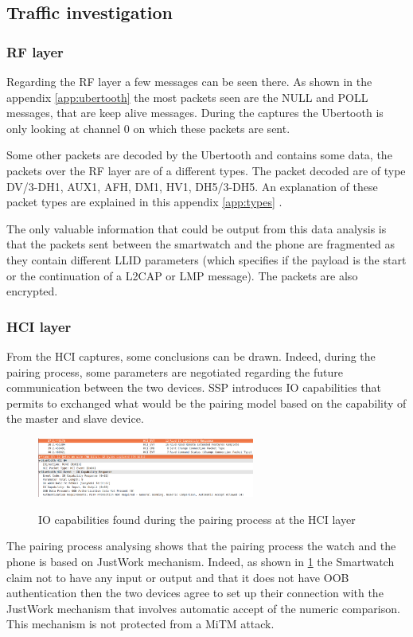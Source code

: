 \subsection{Traffic investigation}
\subsubsection{RF layer}
Regarding the RF layer a few messages can be seen there. As shown in the appendix \ref{app:ubertooth} the most packets seen are the NULL and POLL messages, that are keep alive messages. During the captures the Ubertooth is only looking at channel 0 on which these packets are sent.

Some other packets are decoded by the Ubertooth and contains some data, the packets over the RF layer are of a different types. The packet decoded are of type DV/3-DH1, AUX1, AFH, DM1, HV1, DH5/3-DH5. An explanation of these packet types are explained in this appendix \ref{app:types} .

The only valuable information that could be output from this data analysis is that the packets sent between the smartwatch and the phone are fragmented as they contain different LLID parameters (which specifies if the payload is the start or the continuation of a L2CAP or LMP message). The packets are also encrypted.

\subsubsection{HCI layer}
From the HCI captures, some conclusions can be drawn. Indeed, during the pairing process, some parameters are negotiated regarding the future communication between the two devices. SSP introduces IO capabilities that permits to exchanged what would be the pairing model based on the capability of the master and slave device. 
\begin{figure}[!h]
  \begin{center}
	\includegraphics[width=270px]{images/IO_PARAM.png}
	\label{fig:io}
	\caption{IO capabilities found during the pairing process at the HCI layer}
  \end{center}
\end{figure}
The pairing process analysing shows that the pairing process the watch and the phone is based on JustWork mechanism. Indeed, as shown in \ref{fig:io} the Smartwatch claim not to have any input or output and that it does not have OOB authentication then the two devices agree to set up their connection with the JustWork mechanism that involves automatic accept of the numeric comparison. This mechanism is not protected from a MiTM attack.

